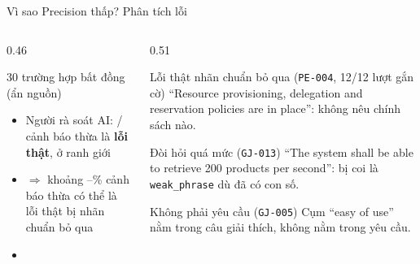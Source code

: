 \documentclass[aspectratio=169,10pt]{beamer}
\begin{document}
\begin{frame}{Vì sao Precision thấp? Phân tích lỗi}
  \begin{columns}[T]
    \begin{column}{0.46\textwidth}
      \begin{block}{30 trường hợp bất đồng (ẩn nguồn)}
        \small
        \begin{itemize}
          \item Người rà soát AI: \numAIRevReal/\numAIRevN{} cảnh báo thừa là \textbf{lỗi thật}, \numAIRevBorder{} ở ranh giới
          \item $\Rightarrow$ khoảng \numAIRevRealLo--\numAIRevRealHi\% cảnh báo thừa có thể là lỗi thật bị nhãn chuẩn bỏ qua
          \item \numHCSlideC
        \end{itemize}
      \end{block}
    \end{column}
    \begin{column}{0.51\textwidth}
      \scriptsize
      \begin{exampleblock}{Lỗi thật nhãn chuẩn bỏ qua (\texttt{PE-004}, 12/12 lượt gắn cờ)}
        ``Resource provisioning, delegation and reservation policies are in place'': không nêu chính sách nào.
      \end{exampleblock}
      \begin{alertblock}{Đòi hỏi quá mức (\texttt{GJ-013})}
        ``The system shall be able to retrieve 200 products per second'': bị coi là \texttt{weak\_phrase} dù đã có con số.
      \end{alertblock}
      \begin{alertblock}{Không phải yêu cầu (\texttt{GJ-005})}
        Cụm ``easy of use'' nằm trong câu giải thích, không nằm trong yêu cầu.
      \end{alertblock}
    \end{column}
  \end{columns}
\end{frame}
\end{document}
